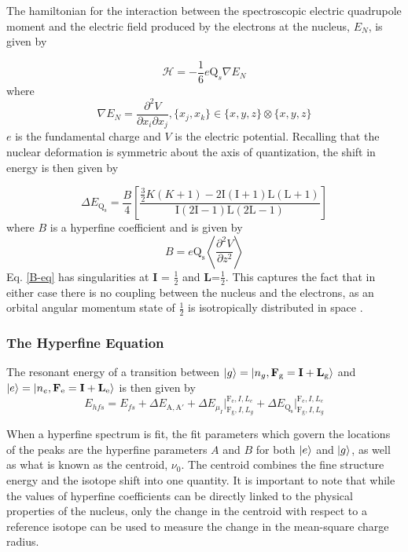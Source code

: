 The hamiltonian for the interaction between the spectroscopic electric quadrupole moment and the electric field produced by the electrons at the nucleus, $E_N$, is given by

\begin{equation}
\mathcal{H} = - \frac{1}{6}e\mathrm{Q}_s\nabla{E_N}
\end{equation}
where
\begin{equation}
\nabla{E_N} = \frac{\partial^2V}{\partial x_i\partial x_j}, \{x_j,x_k\} \in \{x,y,z\} \otimes \{x,y,z\}
\end{equation}
$e$ is the fundamental charge and $V$ is the electric potential. Recalling that the nuclear deformation is symmetric about the axis of quantization, the shift in energy is then given by

\begin{equation}
\Delta E_{\mathrm{Q_s}} = \frac{B}{4}\left[\frac{\frac{3}{2}K(K+1)-2\mathrm{I}(\mathrm{I}+1)\mathrm{L}(\mathrm{L}+1)}{\mathrm{I}(2\mathrm{I}-1)\mathrm{L}(2\mathrm{L}-1)}\right]
\label{B-eq}
\end{equation}
where $B$ is a hyperfine coefficient and is given by
\begin{equation}
B = e\mathrm{Q_s}\left\langle\frac{\partial^2V}{\partial z^2} \right\rangle
\end{equation}
Eq. \ref{B-eq} has singularities at \textbf{I} = $\frac{1}{2}$ and \textbf{L}=$\frac{1}{2}$. This captures the fact that in either case there is no coupling between the nucleus and the electrons, as an orbital angular momentum state of $\frac{1}{2}$ is isotropically distributed in space .

\subsubsection*{The Hyperfine Equation}
The resonant energy of a transition between $\ket{g}=\ket{n_g,\mathrm{\textbf{F}_g=\textbf{I} + \textbf{L}_g}}$ and $\ket{e}=\ket{n_e,\mathrm{\textbf{F}_e=\textbf{I} + \textbf{L}_e}}$ is then given by
\begin{equation}
E_{hfs} = E_{fs} +  \Delta E_{\mathrm{A,A'}}+\Delta E_{\mu_I}\Bigr|_{\mathrm{F_g},I,L_g}^{\mathrm{F_e},I,L_e}+\Delta E_{\mathrm{Q_s}}\Bigr|_{\mathrm{F_g},I,L_g}^{\mathrm{F_e},I,L_e}
\end{equation}

When a hyperfine spectrum is fit, the fit parameters which govern the locations of the peaks are the hyperfine parameters $A$ and $B$ for both $\ket{e}$ and $\ket{g}$, as well as what is known as the centroid, $\nu_0$. The centroid combines the fine structure energy and the isotope shift into one quantity. It is important to note that while the values of hyperfine coefficients can be directly linked to the physical properties of the nucleus, only the change in the centroid with respect to a reference isotope can be used to measure the change in the mean-square charge radius.

